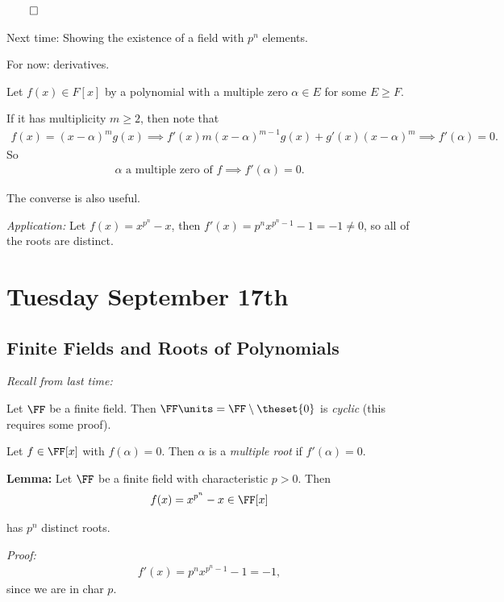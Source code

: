 \(\qed\)

Next time: Showing the existence of a field with \(p^n\) elements.

For now: derivatives.

Let \(f(x) \in F[x]\) by a polynomial with a multiple zero
\(\alpha \in E\) for some \(E \geq F\).

If it has multiplicity \(m \geq 2\), then note that
\begin{align*}
f(x) = (x-\alpha)^m g(x) \implies f'(x) m(x-\alpha)^{m-1}g(x) + g'(x)(x-\alpha)^m \implies f'(\alpha) = 0.
\end{align*} So
\begin{align*}
\alpha \text{ a multiple zero of } f \implies f'(\alpha) = 0
.\end{align*}

The converse is also useful.

\emph{Application:} Let \(f(x) = x^{p^n} - x\), then
\(f'(x) = p^n x^{p^n - 1} - 1 = -1 \neq 0\), so all of the roots are
distinct.

\hypertarget{tuesday-september-17th}{%
\section{Tuesday September 17th}\label{tuesday-september-17th}}

\hypertarget{finite-fields-and-roots-of-polynomials}{%
\subsection{Finite Fields and Roots of
Polynomials}\label{finite-fields-and-roots-of-polynomials}}

\emph{Recall from last time:}

Let \(\FF\) be a finite field. Then
\(\FF\units = \FF\setminus\theset{0}\) is \emph{cyclic} (this requires
some proof).

Let \(f \in \FF[x]\) with \(f(\alpha) = 0\). Then \(\alpha\) is a
\emph{multiple root} if \(f'(\alpha) = 0\).

\textbf{Lemma:} Let \(\FF\) be a finite field with characteristic
\(p > 0\). Then
\begin{align*}
f(x) = x^{p^n} - x \in \FF[x]
\end{align*}

has \(p^n\) distinct roots.

\emph{Proof:}
\begin{align*}
f'(x) = p^n x^{p^n-1}-1 = -1
,\end{align*} since we are in char \(p\).


